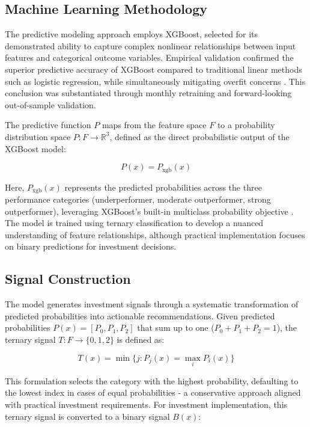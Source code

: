 \subsection{Machine Learning Methodology}

The predictive modeling approach employs XGBoost, selected for its demonstrated ability to capture complex nonlinear relationships between input features and categorical outcome variables. Empirical validation confirmed the superior predictive accuracy of XGBoost compared to traditional linear methods such as logistic regression, while simultaneously mitigating overfit concerns \parencite{Yang2024ComparisonClassification}. This conclusion was substantiated through monthly retraining and forward-looking out-of-sample validation.

The predictive function $P$ maps from the feature space $F$ to a probability distribution space $P: F \rightarrow \mathbb{R}^3$, defined as the direct probabilistic output of the XGBoost model:

\begin{equation}
P(x) = P_{\text{xgb}}(x)
\end{equation}

Here, $P_{\text{xgb}}(x)$ represents the predicted probabilities across the three performance categories (underperformer, moderate outperformer, strong outperformer), leveraging XGBoost's built-in multiclass probability objective \parencite{Guillaume2023HowClassification}. The model is trained using ternary classification to develop a nuanced understanding of feature relationships, although practical implementation focuses on binary predictions for investment decisions.

\subsection{Signal Construction}

The model generates investment signals through a systematic transformation of predicted probabilities into actionable recommendations. Given predicted probabilities $P(x) = [P_0, P_1, P_2]$ that sum up to one ($P_0 + P_1 + P_2 = 1$), the ternary signal $T: F \rightarrow \{0,1,2\}$ is defined as:

\begin{equation}
T(x) = \min \{ j : P_j(x) = \max_i P_i(x) \}
\end{equation}

This formulation selects the category with the highest probability, defaulting to the lowest index in cases of equal probabilities - a conservative approach aligned with practical investment requirements. For investment implementation, this ternary signal is converted to a binary signal $B(x)$:

